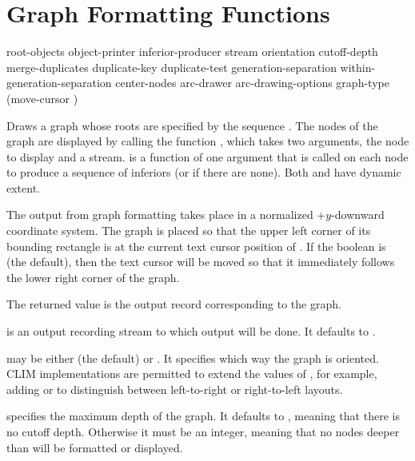 \section {Graph Formatting Functions}

 {root-objects object-printer inferior-producer
                                  \key stream
                                       orientation cutoff-depth
                                       merge-duplicates duplicate-key duplicate-test
                                       generation-separation within-generation-separation
                                       center-nodes
                                       arc-drawer arc-drawing-options
                                       graph-type (move-cursor )}

Draws a graph whose roots are specified by the sequence .  The
nodes of the graph are displayed by calling the function ,
which takes two arguments, the node to display and a stream.
 is a function of one argument that is called on each
node to produce a sequence of inferiors (or  if there are none).  Both
 and  have dynamic extent.

The output from graph formatting takes place in a normalized +$y$-downward
coordinate system.  The graph is placed so that the upper left corner of its
bounding rectangle is at the current text cursor position of .  If
the boolean  is  (the default), then the text cursor
will be moved so that it immediately follows the lower right corner of the
graph.

The returned value is the output record corresponding to the graph.

 is an output recording stream to which output will be done.  It
defaults to .

 may be either  (the default) or
.  It specifies which way the graph is oriented.  CLIM
implementations are permitted to extend the values of , for
example, adding  or  to distinguish between left-to-right
or right-to-left layouts.

 specifies the maximum depth of the graph.  It defaults to
, meaning that there is no cutoff depth.  Otherwise it must be an
integer, meaning that no nodes deeper than  will be formatted
or displayed.

